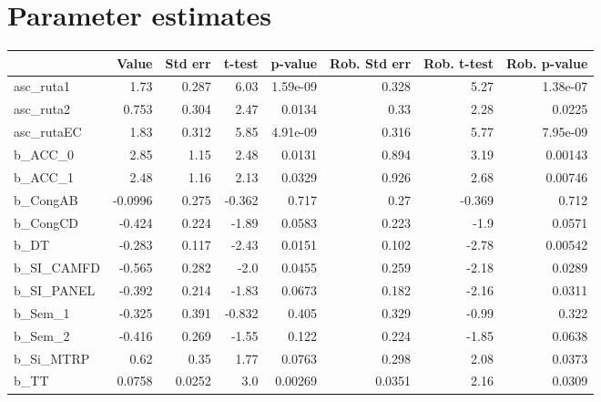 \section{Parameter estimates}
\begin{tabular}{lrrrrrrr}
\toprule
{} &   Value &  Std err &  t-test &  p-value &  Rob. Std err &  Rob. t-test &  Rob. p-value \\
\midrule
asc\_ruta1  &    1.73 &    0.287 &    6.03 & 1.59e-09 &         0.328 &         5.27 &      1.38e-07 \\
asc\_ruta2  &   0.753 &    0.304 &    2.47 &   0.0134 &          0.33 &         2.28 &        0.0225 \\
asc\_rutaEC &    1.83 &    0.312 &    5.85 & 4.91e-09 &         0.316 &         5.77 &      7.95e-09 \\
b\_ACC\_0    &    2.85 &     1.15 &    2.48 &   0.0131 &         0.894 &         3.19 &       0.00143 \\
b\_ACC\_1    &    2.48 &     1.16 &    2.13 &   0.0329 &         0.926 &         2.68 &       0.00746 \\
b\_CongAB   & -0.0996 &    0.275 &  -0.362 &    0.717 &          0.27 &       -0.369 &         0.712 \\
b\_CongCD   &  -0.424 &    0.224 &   -1.89 &   0.0583 &         0.223 &         -1.9 &        0.0571 \\
b\_DT       &  -0.283 &    0.117 &   -2.43 &   0.0151 &         0.102 &        -2.78 &       0.00542 \\
b\_SI\_CAMFD &  -0.565 &    0.282 &    -2.0 &   0.0455 &         0.259 &        -2.18 &        0.0289 \\
b\_SI\_PANEL &  -0.392 &    0.214 &   -1.83 &   0.0673 &         0.182 &        -2.16 &        0.0311 \\
b\_Sem\_1    &  -0.325 &    0.391 &  -0.832 &    0.405 &         0.329 &        -0.99 &         0.322 \\
b\_Sem\_2    &  -0.416 &    0.269 &   -1.55 &    0.122 &         0.224 &        -1.85 &        0.0638 \\
b\_Si\_MTRP  &    0.62 &     0.35 &    1.77 &   0.0763 &         0.298 &         2.08 &        0.0373 \\
b\_TT       &  0.0758 &   0.0252 &     3.0 &  0.00269 &        0.0351 &         2.16 &        0.0309 \\
\bottomrule
\end{tabular}

